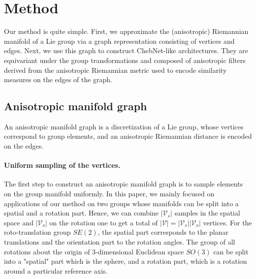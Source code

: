 \documentclass{article}
\begin{document}
\section{Method} \label{sec:method}

Our method is quite simple. First, we approximate the (anisotropic) Riemannian manifold of a Lie group via a graph representation consisting of vertices and edges. Next, we use this graph to construct ChebNet-like architectures. They are equivariant under the group transformations and composed of anisotropic filters derived from the anisotropic Riemannian metric used to encode similarity measures on the edges of the graph.

\subsection{Anisotropic manifold graph} \label{sec:anisotropic_manifold_graph}

An anisotropic manifold graph is a discretization of a Lie group, whose vertices correspond to group elements, and an anisotropic Riemannian distance is encoded on the edges. 

\paragraph{Uniform sampling of the vertices.} The first step to construct an anisotropic manifold graph is to sample elements on the group manifold uniformly. In this paper, we mainly focused on applications of our method on two groups whose manifolds can be split into a spatial and a rotation part. Hence, we can combine $|\mathcal{V}_s|$ samples in the spatial space and $|\mathcal{V}_o|$ on the rotation one to get a total of $|\mathcal{V}| = |\mathcal{V}_s| |\mathcal{V}_o|$ vertices. For the roto-translation group  $SE(2)$, the spatial part corresponds to the planar translations and the orientation part to the rotation angles. The group of all rotations about the origin of 3-dimensional Euclidean space $SO(3)$ can be split into a "spatial" part which is the sphere, and a rotation part, which is a rotation around a particular reference axis. 
\end{document}
